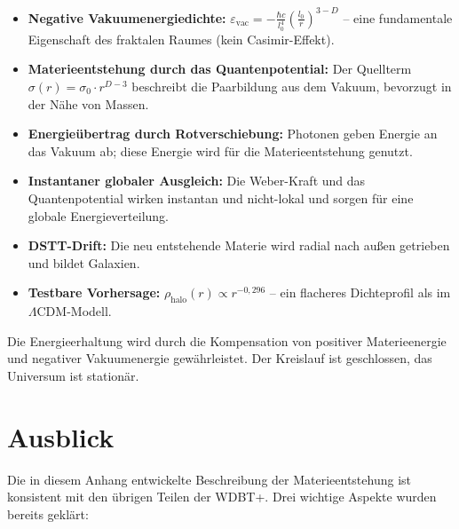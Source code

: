 \begin{itemize}
    \item \textbf{Negative Vakuumenergiedichte:} \( \varepsilon_{\text{vac}} = -\frac{\hbar c}{l_0^4} \left( \frac{l_0}{r} \right)^{3-D} \) – eine fundamentale Eigenschaft des fraktalen Raumes (kein Casimir-Effekt).

    \item \textbf{Materieentstehung durch das Quantenpotential:} Der Quellterm \( \sigma(r) = \sigma_0 \cdot r^{D-3} \) beschreibt die Paarbildung aus dem Vakuum, bevorzugt in der Nähe von Massen.

    \item \textbf{Energieübertrag durch Rotverschiebung:} Photonen geben Energie an das Vakuum ab; diese Energie wird für die Materieentstehung genutzt.

    \item \textbf{Instantaner globaler Ausgleich:} Die Weber-Kraft und das Quantenpotential wirken instantan und nicht-lokal und sorgen für eine globale Energieverteilung.

    \item \textbf{DSTT-Drift:} Die neu entstehende Materie wird radial nach außen getrieben und bildet Galaxien.

    \item \textbf{Testbare Vorhersage:} \( \rho_{\text{halo}}(r) \propto r^{-0,296} \) – ein flacheres Dichteprofil als im \(\Lambda\)CDM-Modell.
\end{itemize}

Die Energieerhaltung wird durch die Kompensation von positiver Materieenergie und negativer Vakuumenergie gewährleistet. Der Kreislauf ist geschlossen, das Universum ist stationär.

\section{Ausblick}
\label{app:materieentstehung_ausblick}

Die in diesem Anhang entwickelte Beschreibung der Materieentstehung ist konsistent mit den übrigen Teilen der WDBT+. Drei wichtige Aspekte wurden bereits geklärt:

